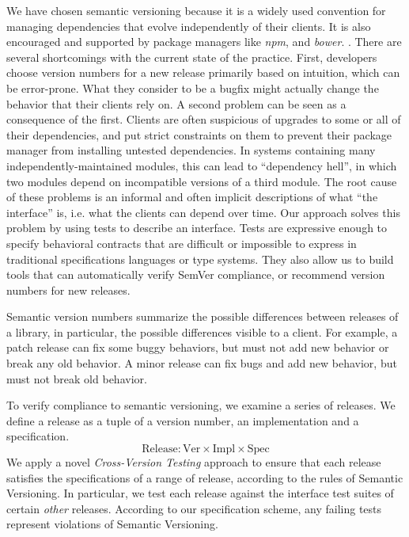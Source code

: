We have chosen semantic versioning because it is a widely used
convention for managing dependencies that evolve independently of
their clients.
%
It is also encouraged and supported by package managers like
\emph{npm}, and \emph{bower}.
%
.
%
There are several shortcomings with the current state of the
practice. 
%
First, developers choose version numbers for a new release primarily
based on intuition, which can be error-prone. What they consider to be
a bugfix might actually change the behavior that their clients rely
on.
%
A second problem can be seen as a consequence of the first. Clients
are often suspicious of upgrades to some or all of their dependencies,
and put strict constraints on them to prevent their package manager
from installing untested dependencies. 
%
In systems containing many independently-maintained modules, this can
lead to ``dependency hell''\cite{hell}, in which two modules depend on
incompatible versions of a third module. 
%
The root cause of these problems is an informal and often implicit
descriptions of what ``the interface'' is, i.e. what the clients can
depend over time.
%
Our approach solves this problem by using tests to describe an
interface. Tests are expressive enough to specify behavioral contracts
that are difficult or impossible to express in traditional
specifications languages or type systems. They also allow us to build
tools that can automatically verify SemVer compliance, or recommend
version numbers for new releases.

Semantic version numbers summarize the possible differences between
releases of a library, in particular, the possible differences visible
to a client. For example, a patch release can fix some buggy
behaviors, but must not add new behavior or break any old behavior. A
minor release can fix bugs and add new behavior, but must not break
old behavior.

To verify compliance to semantic versioning, we examine a series of
releases.
%
We define a release as a tuple of a version number, an implementation
and a specification.
$$ \text{Release} : \text{Ver} \times \text{Impl} \times \text{Spec} $$
%
We apply a novel \emph{Cross-Version Testing} approach to ensure that
each release satisfies the specifications of a range of release,
according to the rules of Semantic Versioning. In particular, we test
each release against the interface test suites of certain {\em other}
releases. According to our specification scheme, any failing tests
represent violations of Semantic Versioning.

